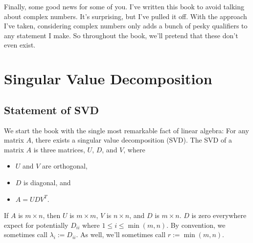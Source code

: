 \documentclass{amsbook}
\newtheorem{theorem}{Theorem}
\begin{document}
Finally, some good news for some of you.  I've written this book to avoid talking about complex numbers.  It's surprising, but I've pulled it off.  With the approach I've taken, considering complex numbers only adds a bunch of pesky qualifiers to any statement I make.  So throughout the book, we'll pretend that these don't even exist.

\chapter{Singular Value Decomposition}
\section{Statement of SVD}

We start the book with the single most remarkable fact of linear algebra:  For any matrix $A$, there exists a singular value decomposition (SVD).  The SVD of a matrix $A$ is three matrices, $U$, $D$, and $V$, where

\begin{itemize}
	\item $U$ and $V$ are orthogonal,
	\item $D$ is diagonal, and
	\item $A=UDV^T$.
\end{itemize}

If $A$ is $m\times n$, then $U$ is $m\times m$, $V$ is $n\times n$, and $D$ is $m\times n$.  $D$ is zero everywhere expect for potentially $D_{ii}$ where $1\leq i\leq\min(m, n)$.  By convention, we sometimes call $\lambda_i:=D_{ii}$.  As well, we'll sometimes call $r:=\min(m, n)$.
\end{document}
